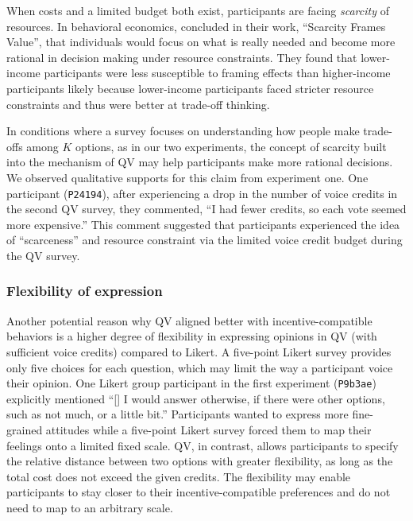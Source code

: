 When costs and a limited budget both exist, participants are facing \textit{scarcity} of resources. In behavioral economics, \textcite{Shah2015a} concluded in their work, ``Scarcity Frames Value'', that individuals would focus on what is really needed and become more rational in decision making under resource constraints. They found that lower-income participants were less susceptible to framing effects than higher-income participants likely because lower-income participants faced stricter resource constraints and thus were better at trade-off thinking. 

In conditions where a survey focuses on understanding how people make trade-offs among $K$ options, as in our two experiments, the concept of scarcity built into the mechanism of QV may help participants make more rational decisions. We observed qualitative supports for this claim from experiment one. One participant (\texttt{P24194}), after experiencing a drop in the number of voice credits in the second QV survey, they commented, ``I had fewer credits, so each vote seemed more expensive.'' This comment suggested that participants experienced the idea of ``scarceness'' and resource constraint via the limited voice credit budget during the QV survey.

\subsubsection{Flexibility of expression}
Another potential reason why QV aligned better with incentive-compatible behaviors is a higher degree of flexibility in expressing opinions in QV (with sufficient voice credits) compared to Likert. A five-point Likert survey provides only five choices for each question, which may limit the way a participant voice their opinion. One Likert group participant in the first experiment (\texttt{P9b3ae}) explicitly mentioned ``[\textellipsis] I would answer otherwise, if there were other options, such as not much, or a little bit.'' Participants wanted to express more fine-grained attitudes while a five-point Likert survey forced them to map their feelings onto a limited fixed scale. QV, in contrast, allows participants to specify the relative distance between two options with greater flexibility, as long as the total cost does not exceed the given credits. The flexibility may enable participants to stay closer to their incentive-compatible preferences and do not need to map to an arbitrary scale.

